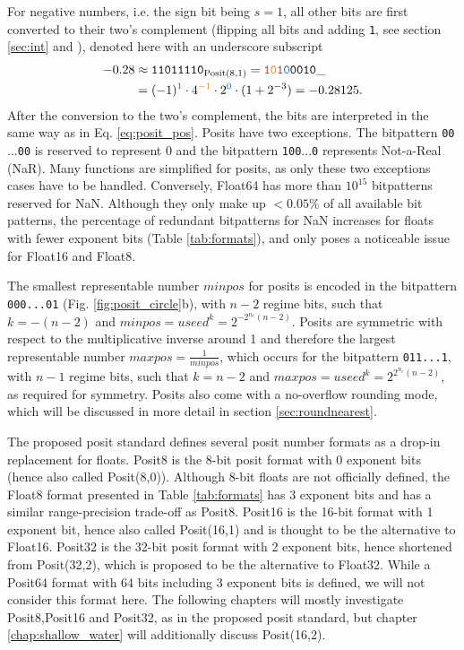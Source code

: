 For negative numbers, i.e. the sign bit being $s=1$, all other bits are first converted to their two's complement (flipping all bits and adding \texttt{1}, 
see section \ref{sec:int} and \cite{Choo2003}), denoted here with an underscore subscript
\begin{equation}
\begin{split}
-0.28 &  \approx \mathtt{11011110}_{\op{Posit}(8,1)} = \mathtt{{\color{psign}1}{\color{pregime}0}{\color{pregimet}1}{\color{pexpo}0}0010}\_ \\
& = (-1)^{\color{psign}1} \cdot 4^{\color{pregime}-1} \cdot 2^{\color{pexpo}0} \cdot (1+2^{-3}) = -0.28125.
\end{split}
\label{eq:2comp}
\end{equation}
After the conversion to the two's complement, the bits are interpreted in the same way as in Eq. \ref{eq:posit_pos}. Posits have two exceptions.
The bitpattern \texttt{00$...$00} is reserved to represent 0 and the bitpattern \texttt{100$...$0} represents Not-a-Real (NaR). Many functions
are simplified for posits, as only these two exceptions cases have to be handled. Conversely, Float64 has more than
$10^{15}$ bitpatterns reserved for NaN. Although they only make up $< 0.05\%$ of all available bit patterns, the percentage of redundant
bitpatterns for NaN increases for floats with fewer exponent bits (Table \ref{tab:formats}), and only poses a noticeable issue for Float16
and Float8.

The smallest representable number $minpos$ for posits is encoded in the bitpattern \texttt{{\color{psign}0}{\color{pregime}00...0}{\color{pregimet}1}}
(Fig. \ref{fig:posit_circle}b), with $n-2$ regime bits, such that $k = -(n-2)$ and $minpos = useed^k = 2^{-2^{n_e}(n-2)}$. Posits are symmetric with respect
to the multiplicative inverse around 1 and therefore the largest representable number $maxpos =  \tfrac{1}{minpos}$, which occurs for 
the bitpattern \texttt{{\color{psign}0}{\color{pregime}11...1}}, with $n-1$ regime bits, such that $k=n-2$ and $maxpos = useed^k = 2^{2^{n_e}(n-2)}$,
as required for symmetry. Posits also come with a no-overflow rounding mode, which will be discussed in more detail
in section \ref{sec:roundnearest}.

The proposed posit standard defines several posit number formats as a drop-in replacement for floats. Posit8 is the 8-bit posit format with 0
exponent bits (hence also called Posit(8,0)). Although 8-bit floats are not officially defined, the Float8 format presented in Table \ref{tab:formats}
has 3 exponent bits and has a similar range-precision trade-off as Posit8. Posit16 is the 16-bit format with 1 exponent bit, hence also called
Posit(16,1) and is thought to be the alternative to Float16. Posit32 is the 32-bit posit format with 2 exponent bits, hence shortened from
Posit(32,2), which is proposed to be the alternative to Float32. While a Posit64 format with 64 bits including 3 exponent bits is defined,
we will not consider this format here. The following chapters will mostly investigate Posit8,Posit16 and Posit32,
as in the proposed posit standard, but chapter \ref{chap:shallow_water} will additionally discuss Posit(16,2).

